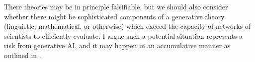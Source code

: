 There theories may be in principle falsifiable, but we should also consider whether there might be sophisticated components of a generative theory (linguistic, mathematical, or otherwise) which exceed the capacity of networks of scientists to efficiently evaluate.  I argue such a potential situation represents a risk from generative AI, and it may happen in an accumulative manner as outlined in \citep{Kasirzadeh2024WIP}.  
























